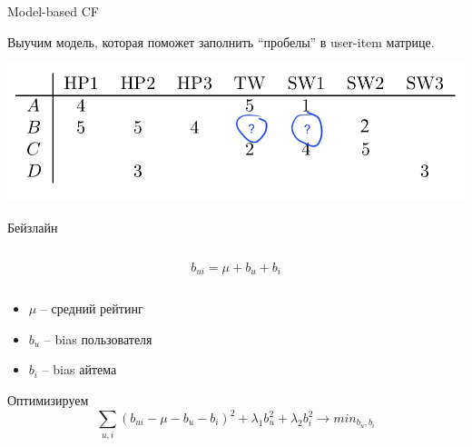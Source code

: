\documentclass[11pt,aspectratio=169]{beamer}
\begin{document}
\begin{frame}{Model-based CF}

\begin{tcolorbox}[colback=info!5,colframe=info!80,title=Идея]
Выучим модель, которая поможет заполнить ``пробелы'' в user-item матрице.
\end{tcolorbox}

\begin{center}
\includegraphics[scale=0.5]{images/utility.png}
\end{center}

\end{frame}

\begin{frame}{Бейзлайн}

\begin{columns}
\begin{column}{0.2\textwidth} 
\end{column}
\begin{column}{0.5\textwidth} 
\begin{tcolorbox}[colback=info!5,colframe=info!80,title=Модель]
\[
b_{ui} = \mu + b_u + b_i
\]
\end{tcolorbox}
\end{column}
\begin{column}{0.2\textwidth} 
\end{column}
\end{columns}

\vfill

\begin{itemize}
\item $\mu$ -- средний рейтинг
\item $b_u$ -- bias пользователя
\item $b_i$ -- bias айтема
\end{itemize}

\vfill

Оптимизируем
\[
\sum_{u, i} (b_{ui} - \mu - b_u - b_i)^2 + \lambda_1 b_u^2 + \lambda_2 b_i^2 \rightarrow min_{b_u, b_i}
\]

\end{frame}
\end{document}
